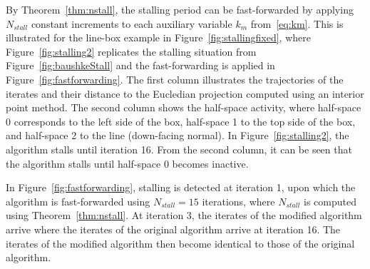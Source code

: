 \documentclass[hidelinks]{article}
\begin{document}
By Theorem~\eqref{thm:nstall}, the stalling period can be fast-forwarded by applying $N_{stall}$ constant increments to each auxiliary variable $k_m$ from~\eqref{eq:km}. This is illustrated for the line-box example in Figure~\ref{fig:stallingfixed}, where Figure~\ref{fig:stalling2} replicates the stalling situation from Figure~\ref{fig:baushkeStall} and the fast-forwarding is applied in Figure~\ref{fig:fastforwarding}. The first column illustrates the trajectories of the iterates and their distance to the Eucledian projection computed using an interior point method. The second column shows the half-space activity, where half-space 0 corresponds to the left side of the box, half-space 1 to the top side of the box, and half-space 2 to the line (down-facing normal). In Figure~\ref{fig:stalling2}, the algorithm stalls until iteration 16. From the second column, it can be seen that the algorithm stalls until half-space 0 becomes inactive. 

In Figure~\ref{fig:fastforwarding}, stalling is detected at iteration 1, upon which the algorithm is fast-forwarded using $N_{stall}=15$ iterations, where $N_{stall}$ is computed using Theorem~\ref{thm:nstall}. At iteration 3, the iterates of the modified algorithm arrive where the iterates of the original algorithm arrive at iteration 16. The iterates of the modified algorithm then become identical to those of the original algorithm.
\end{document}
